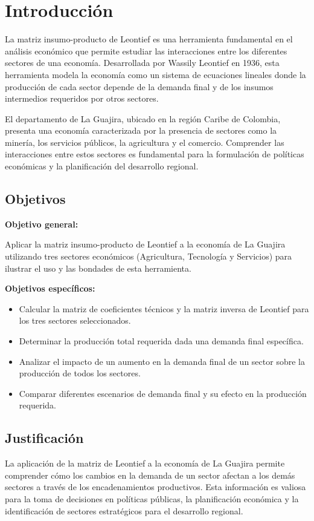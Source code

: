 \section{Introducción}

La matriz insumo-producto de Leontief es una herramienta fundamental en el análisis económico que permite estudiar las interacciones entre los diferentes sectores de una economía. Desarrollada por Wassily Leontief en 1936, esta herramienta modela la economía como un sistema de ecuaciones lineales donde la producción de cada sector depende de la demanda final y de los insumos intermedios requeridos por otros sectores.

El departamento de La Guajira, ubicado en la región Caribe de Colombia, presenta una economía caracterizada por la presencia de sectores como la minería, los servicios públicos, la agricultura y el comercio. Comprender las interacciones entre estos sectores es fundamental para la formulación de políticas económicas y la planificación del desarrollo regional.

\subsection{Objetivos}

\textbf{Objetivo general:}

Aplicar la matriz insumo-producto de Leontief a la economía de La Guajira utilizando tres sectores económicos (Agricultura, Tecnología y Servicios) para ilustrar el uso y las bondades de esta herramienta.

\textbf{Objetivos específicos:}

\begin{itemize}
    \item Calcular la matriz de coeficientes técnicos y la matriz inversa de Leontief para los tres sectores seleccionados.
    \item Determinar la producción total requerida dada una demanda final específica.
    \item Analizar el impacto de un aumento en la demanda final de un sector sobre la producción de todos los sectores.
    \item Comparar diferentes escenarios de demanda final y su efecto en la producción requerida.
\end{itemize}

\subsection{Justificación}

La aplicación de la matriz de Leontief a la economía de La Guajira permite comprender cómo los cambios en la demanda de un sector afectan a los demás sectores a través de los encadenamientos productivos. Esta información es valiosa para la toma de decisiones en políticas públicas, la planificación económica y la identificación de sectores estratégicos para el desarrollo regional.

\clearpage
